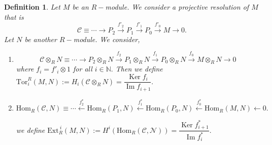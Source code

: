 \documentclass[11pt]{amsart}
\newtheorem{defn}[theorem]{Definition}
\newcommand{\NN}{\mathbb N}
\newcommand{\Hom}[1]{\text{Hom}_R\left(#1\right)}
\DeclareMathOperator{\im}{\text{Im}}
\DeclareMathOperator{\Ker}{\text{Ker}}
\begin{document}
\begin{defn}

Let $M$ be an $R-$module. We consider a projective resolution of $M$ that is $$\mathcal{C}\equiv \cdots\to P_2\xrightarrow{f'_2} P_1\xrightarrow{f'_1} P_0\xrightarrow{f'_0} M\to 0.$$ Let $N$ be another $R-$module. We consider, \begin{enumerate}

\item $$\mathcal{C}\otimes_R N\equiv \cdots\to P_2\otimes_R N\xrightarrow{f_2} P_1\otimes_R N\xrightarrow{f_1} P_0\otimes_R N\xrightarrow{f_0} M\otimes_R N\to 0$$ where $f_i=f'_i\otimes 1$ for all $i\in{\NN}.$ Then we define $\text{Tor}_i^R (M,N):=H_i(\mathcal{C}\otimes_R N)=\dfrac{\Ker f_i}{\im f_{i+1}}.$

\item $$\Hom{\mathcal{C},N}\equiv \cdots\xleftarrow{f^*_2}\Hom{P_1,N}\xleftarrow{f^*_1}\Hom{P_0,N}\xleftarrow{f^*_0}\Hom{M,N}\leftarrow 0.$$

we define $\text{Ext}^{~i}_R(M,N):=H^i(\Hom{\mathcal{C,N}})=\dfrac{\Ker f^*_{i+1}}{\im f^*_i}.$

\end{enumerate}

\end{defn}
\end{document}
